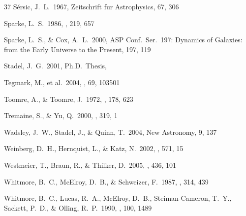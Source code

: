 \documentclass[preprint]{aastex}
\begin{document}
\begin{thebibliography}{37}
 S{\' e}rsic, J.~L.\ 1967, 
Zeitschrift fur Astrophysics, 67, 306 
  
 Sparke, L.~S.\ 1986, \mnras, 
219, 657 
 
 Sparke, L.~S., \& Cox, 
A.~L.\ 2000, ASP Conf.~Ser.~197: Dynamics of Galaxies: from the Early 
Universe to the Present, 197, 119 
 
 Stadel, J.~G.\ 2001, 
Ph.D.~Thesis,  

 Tegmark, M., et al.\ 
2004, \prd, 69, 103501 
  
 Toomre, A., \& 
Toomre, J.\ 1972, \apj, 178, 623 

 Tremaine, S., \& Yu, 
Q.\ 2000, \mnras, 319, 1 

 Wadsley, J.~W., Stadel, 
J., \& Quinn, T.\ 2004, New Astronomy, 9, 137 
 
 Weinberg, D.~H., 
Hernquist, L., \& Katz, N.\ 2002, \apj, 571, 15 
 
 Westmeier, T., Braun, 
R., \& Thilker, D.\ 2005, \aap, 436, 101

 Whitmore, B.~C., 
McElroy, D.~B., \& Schweizer, F.\ 1987, \apj, 314, 439 

 Whitmore, B.~C., 
Lucas, R.~A., McElroy, D.~B., Steiman-Cameron, T.~Y., Sackett, P.~D., \& 
Olling, R.~P.\ 1990, \aj, 100, 1489 
  
  
\end{thebibliography}
\end{document}
